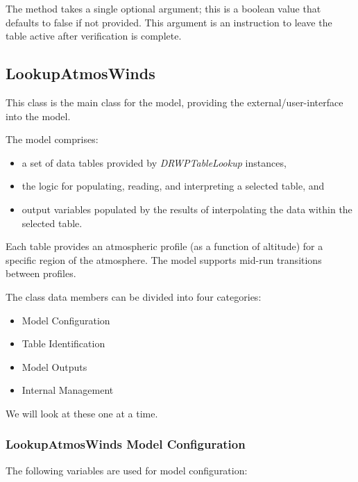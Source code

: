 \documentclass[11pt,fleqn]{report}
\begin{document}
The method takes a single optional argument; this is a boolean value that
defaults to false if not provided. This argument is an instruction to leave
the table active after verification is complete.


\subsection{LookupAtmosWinds}
This class is the main class for the model, providing the
external/user-interface into the model.

The model comprises:
\begin{itemize}
\item a set of data tables provided by \textit{DRWPTableLookup}
  instances,
\item the logic for populating, reading, and interpreting a selected table,
  and
\item output variables populated by the results of interpolating the data
  within the selected table.
\end{itemize}
Each table provides an atmospheric profile (as a
function of altitude) for a specific region of the atmosphere. The model
supports mid-run transitions between profiles.

The class data members can be divided into four categories:
\begin{itemize}
\item Model Configuration
\item Table Identification
\item Model Outputs
\item Internal Management
\end{itemize}
We will look at these one at a time.

\subsubsection{LookupAtmosWinds Model Configuration}
The following variables are used for model configuration:
\end{document}
